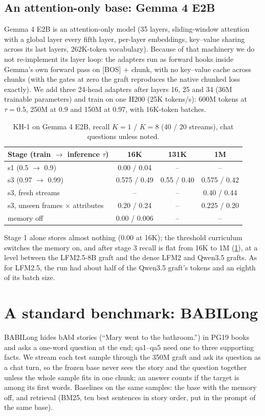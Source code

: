 \documentclass[11pt]{article}
\newcommand{\tauw}{\tau}
\newcommand{\KH}{KH-1}
\begin{document}
\subsection{An attention-only base: Gemma 4 E2B}
\label{sec:gemma}
Gemma 4 E2B \citep{gemma4} is an attention-only model (35 layers, sliding-window attention with a global layer every fifth layer, per-layer embeddings, key--value sharing across its last layers, 262K-token vocabulary). Because of that machinery we do not re-implement its layer loop: the adapters run as forward hooks inside Gemma's own forward pass on [BOS] + chunk, with no key--value cache across chunks (with the gates at zero the graft reproduces the native chunked loss exactly). We add three 24-head adapters after layers 16, 25 and 34 (36M trainable parameters) and train on one H200 (25K tokens/s): 600M tokens at $\tauw = 0.5$, 250M at 0.9 and 150M at 0.97, with 16K-token batches.

\begin{table}[t]
\centering
\small
\caption{\KH{} on Gemma 4 E2B, recall $K = 1$ / $K = 8$ (40 / 20 streams), chat questions unless noted.}
\label{tab:gemma}
\begin{tabular}{@{}lccc@{}}
\toprule
Stage (train $\to$ inference $\tauw$) & 16K & 131K & 1M \\
\midrule
s1 (0.5 $\to$ 0.9) & 0.00 / 0.04 & -- & -- \\
s3 (0.97 $\to$ 0.99) & 0.575 / 0.49 & 0.55 / 0.40 & 0.575 / 0.42 \\
s3, fresh streams & -- & -- & 0.40 / 0.44 \\
s3, unseen frames $\times$ attributes & 0.20 / 0.24 & -- & 0.225 / 0.20 \\
memory off & 0.00 / 0.006 & -- & -- \\
\bottomrule
\end{tabular}
\end{table}

Stage 1 alone stores almost nothing (0.00 at 16K); the threshold curriculum switches the memory on, and after stage 3 recall is flat from 16K to 1M (\cref{tab:gemma}), at a level between the LFM2.5-8B graft and the dense LFM2 and Qwen3.5 grafts. As for LFM2.5, the run had about half of the Qwen3.5 graft's tokens and an eighth of its batch size.

\section{A standard benchmark: BABILong}
\label{sec:babilong}
BABILong \citep{babilong2024} hides bAbI stories (``Mary went to the bathroom.'') in PG19 books and asks a one-word question at the end; qa1--qa5 need one to three supporting facts. We stream each test sample through the 350M graft and ask its question as a chat turn, so the frozen base never sees the story and the question together unless the whole sample fits in one chunk; an answer counts if the target is among its first words. Baselines on the same samples: the base with the memory off, and retrieval (BM25, ten best sentences in story order, put in the prompt of the same base).
\end{document}
